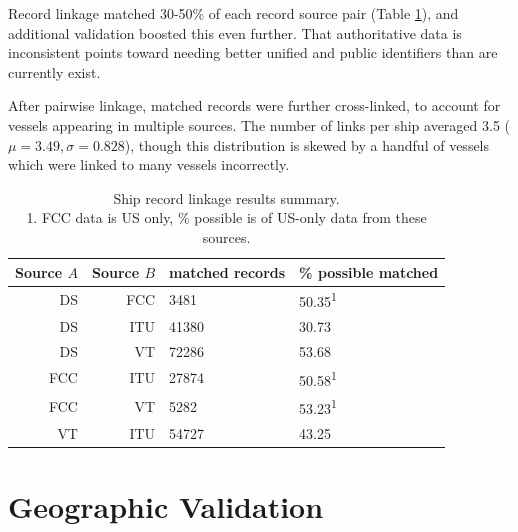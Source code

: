 Record linkage matched 30-50\% of each record source pair (Table \ref{table:ships-record-linkage-results-summary}), and additional validation boosted this even further. That authoritative data is inconsistent points toward needing better unified and public identifiers than are currently exist.

After pairwise linkage, matched records were further cross-linked, %
 to account for vessels appearing in multiple sources. The number of links per ship averaged 3.5 ($\mu = 3.49, \sigma = 0.828$), %
though this distribution is skewed by a handful of vessels which were linked to many vessels incorrectly. 
\begin{table}[htbp]
  \begin{tabular}{rrll} %
    \hline
    Source $A$ & Source $B$ & matched records & \% possible matched \\
    \hline
     DS & FCC &  3481 & 50.35\textsuperscript{1} \\
     DS & ITU & 41380 & 30.73 \\
     DS &  VT & 72286 & 53.68 \\
    FCC & ITU & 27874 & 50.58\textsuperscript{1} \\
    FCC &  VT &  5282 & 53.23\textsuperscript{1} \\
     VT & ITU & 54727 & 43.25 \\
  \end{tabular}
  \caption[Ship record linkage results summary]{Ship record linkage results summary. \\
    1. FCC data is US only, \% possible is of US-only data from these sources.}
  \label{table:ships-record-linkage-results-summary}
\end{table}

\section{Geographic Validation}

